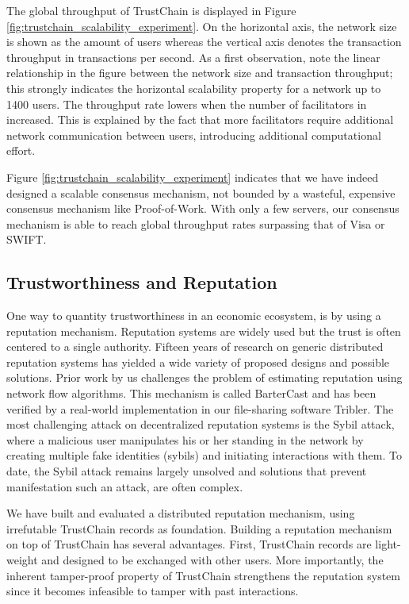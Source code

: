 \documentclass[USenglish]{article}
\begin{document}
The global throughput of TrustChain is displayed in Figure \ref{fig:trustchain_scalability_experiment}.
On the horizontal axis, the network size is shown as the amount of users whereas the vertical axis denotes the transaction throughput in transactions per second.
As a first observation, note the linear relationship in the figure between the network size and transaction throughput; this strongly indicates the horizontal scalability property for a network up to 1400 users.
The throughput rate lowers when the number of facilitators in increased. This is explained by the fact that more facilitators require additional network communication between users, introducing additional computational effort.

Figure \ref{fig:trustchain_scalability_experiment} indicates that we have indeed designed a scalable consensus mechanism, not bounded by a wasteful, expensive consensus mechanism like Proof-of-Work.
With only a few servers, our consensus mechanism is able to reach global throughput rates surpassing that of Visa or SWIFT.

\subsection{Trustworthiness and Reputation}
\label{sec:reputation}
One way to quantity trustworthiness in an economic ecosystem, is by using a reputation mechanism.
Reputation systems are widely used but the trust is often centered to a single authority.
Fifteen years of research on generic distributed reputation systems has yielded a wide variety of proposed designs and possible solutions.
Prior work by us challenges the problem of estimating reputation using network flow algorithms.
This mechanism is called BarterCast and has been verified by a real-world implementation in our file-sharing software Tribler.
The most challenging attack on decentralized reputation systems is the Sybil attack, where a malicious user manipulates his or her standing in the network by creating multiple fake identities (sybils) and initiating interactions with them.
To date, the Sybil attack remains largely unsolved and solutions that prevent manifestation such an attack, are often complex.

We have built and evaluated a distributed reputation mechanism, using irrefutable TrustChain records as foundation.
Building a reputation mechanism on top of TrustChain has several advantages.
First, TrustChain records are light-weight and designed to be exchanged with other users.
More importantly, the inherent tamper-proof property of TrustChain strengthens the reputation system since it becomes infeasible to tamper with past interactions.
\end{document}
